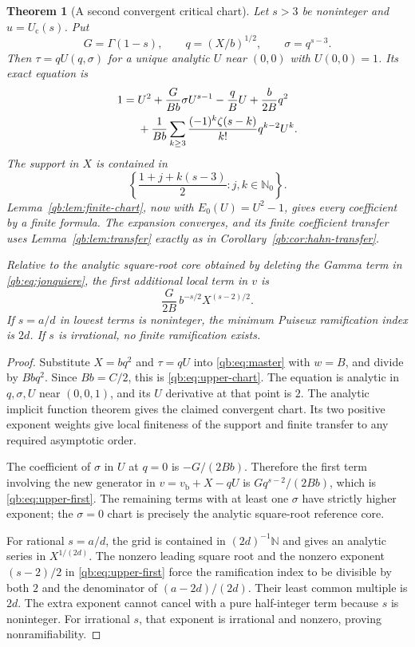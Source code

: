 \documentclass[11pt,a4paper]{article}
\newtheorem{theorem}{Theorem}[section]
\theoremstyle{definition}\newtheorem{definition}[theorem]{Definition}
\theoremstyle{remark}\newtheorem{remark}[theorem]{Remark}
\newcommand{\N}{\mathbb N}
\newcommand{\Uc}{U_{\mathrm c}}
\newcommand{\vb}{v_{\mathrm b}}
\numberwithin{equation}{section}
\begin{document}
\begin{theorem}[A second convergent critical chart]
\label{qb:thm:upper-chart}
Let $s>3$ be noninteger and $u=\Uc(s)$. Put
\[
 G=\Gamma(1-s),\qquad q=(X/b)^{1/2},\qquad \sigma=q^{s-3}.
\]
Then $\tau=qU(q,\sigma)$ for a unique analytic $U$ near $(0,0)$ with
$U(0,0)=1$. Its exact equation is
\begin{align}\label{qb:eq:upper-chart}
 1={}&U^2+\frac{G}{Bb}\sigma U^{s-1}
 -\frac qB U+\frac b{2B}q^2\notag\\
 &+\frac1{Bb}\sum_{k\ge3}
 \frac{(-1)^k\zeta(s-k)}{k!}q^{k-2}U^k.
\end{align}
The support in $X$ is contained in
\begin{equation}\label{qb:eq:upper-grid}
 \left\{\frac{1+j+k(s-3)}2:j,k\in\N_0\right\}.
\end{equation}
Lemma~\ref{qb:lem:finite-chart}, now with $E_0(U)=U^2-1$, gives every
coefficient by a finite formula. The expansion converges, and its finite
coefficient transfer uses Lemma~\ref{qb:lem:transfer} exactly as in
Corollary~\ref{qb:cor:hahn-transfer}.

Relative to the analytic square-root core obtained by deleting the Gamma
term in \eqref{qb:eq:jonquiere}, the first additional local term in $v$ is
\begin{equation}\label{qb:eq:upper-first}
 \frac{G}{2B}\,b^{-s/2}X^{(s-2)/2}.
\end{equation}
If $s=a/d$ in lowest terms is noninteger, the minimum Puiseux ramification
index is $2d$. If $s$ is irrational, no finite ramification exists.
\end{theorem}
\begin{proof}
Substitute $X=bq^2$ and $\tau=qU$ into
\eqref{qb:eq:master} with $w=B$, and divide by $Bbq^2$. Since
$Bb=C/2$, this is \eqref{qb:eq:upper-chart}. The equation is analytic
in $q,\sigma,U$ near $(0,0,1)$, and its $U$ derivative at that point is
$2$. The analytic implicit function theorem gives the claimed convergent
chart. Its two positive exponent weights give local finiteness of the
support and finite transfer to any required asymptotic order.

The coefficient of $\sigma$ in $U$ at $q=0$ is $-G/(2Bb)$. Therefore
the first term involving the new generator in $v=\vb+X-qU$ is
$Gq^{s-2}/(2Bb)$, which is \eqref{qb:eq:upper-first}. The remaining
terms with at least one $\sigma$ have strictly higher exponent; the
$\sigma=0$ chart is precisely the analytic square-root reference core.

For rational $s=a/d$, the grid is contained in $(2d)^{-1}\N$ and gives
an analytic series in $X^{1/(2d)}$. The nonzero leading square root and
the nonzero exponent $(s-2)/2$ in \eqref{qb:eq:upper-first} force the
ramification index to be divisible by both $2$ and the denominator of
$(a-2d)/(2d)$. Their least common multiple is $2d$. The extra exponent
cannot cancel with a pure half-integer term because $s$ is noninteger.
For irrational $s$, that exponent is irrational and nonzero, proving
nonramifiability.
\end{proof}
\end{document}

